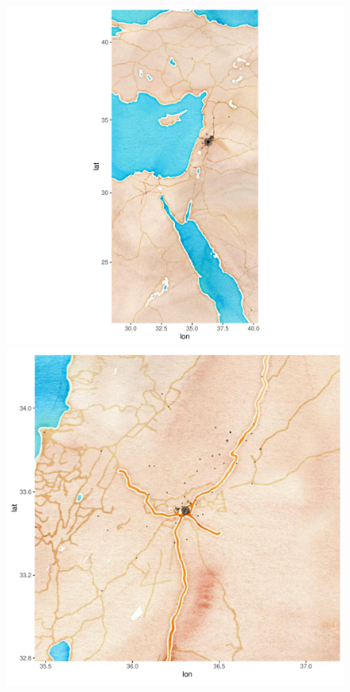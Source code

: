 \begin{figure}[H]
\begin{center}
\begin{minipage}[t]{0.4\textwidth}
\includegraphics[width=\textwidth]{fig/materialspecification/example_scaled_map.pdf}
\end{minipage}
\begin{minipage}[t]{0.4\textwidth}
\includegraphics[width=\textwidth]{fig/materialspecification/example_center_map.pdf}

\end{minipage}
\end{center}
\end{figure}

